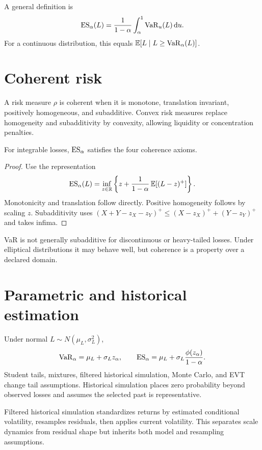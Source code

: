\begin{definition}
A general definition is
\[
\operatorname{ES}_\alpha(L)=
\frac{1}{1-\alpha}\int_\alpha^1\operatorname{VaR}_u(L)\,\mathrm d u.
\]
For a continuous distribution, this equals
$\operatorname{\mathbb E}[L\mid L\geq\operatorname{VaR}_\alpha(L)]$.
\end{definition}

\section{Coherent risk}

A risk measure $\rho$ is coherent when it is monotone, translation invariant,
positively homogeneous, and subadditive. Convex risk measures replace homogeneity
and subadditivity by convexity, allowing liquidity or concentration penalties.

\begin{theorem}
For integrable losses, $\operatorname{ES}_\alpha$ satisfies the four coherence axioms.
\end{theorem}
\begin{proof}
Use the representation
\[
\operatorname{ES}_\alpha(L)=
\inf_{z\in\mathbb R}\left\{
z+\frac{1}{1-\alpha}\operatorname{\mathbb E}[(L-z)^+]
\right\}.
\]
Monotonicity and translation follow directly. Positive homogeneity follows by
scaling $z$. Subadditivity uses
$(X+Y-z_X-z_Y)^+\leq(X-z_X)^++(Y-z_Y)^+$ and takes infima.
\end{proof}

VaR is not generally subadditive for discontinuous or heavy-tailed losses. Under
elliptical distributions it may behave well, but coherence is a property over a
declared domain.

\section{Parametric and historical estimation}

Under normal $L\sim N(\mu_L,\sigma_L^2)$,
\[
\operatorname{VaR}_\alpha=\mu_L+\sigma_Lz_\alpha,\qquad
\operatorname{ES}_\alpha=\mu_L+
\sigma_L\frac{\phi(z_\alpha)}{1-\alpha}.
\]
Student tails, mixtures, filtered historical simulation, Monte Carlo, and EVT change
tail assumptions. Historical simulation places zero probability beyond observed
losses and assumes the selected past is representative.

Filtered historical simulation standardizes returns by estimated conditional
volatility, resamples residuals, then applies current volatility. This separates
scale dynamics from residual shape but inherits both model and resampling assumptions.

